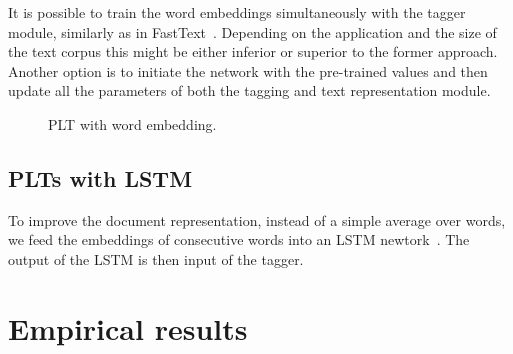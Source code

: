 \documentclass{article}
\newcommand{\sectionBefore}{-0pt}
\newcommand{\sectionAfter}{-0pt}
\begin{document}
It is possible to train the word embeddings simultaneously with the tagger module, similarly as in FastText~\citep{}. Depending on the application and the size of the text corpus this might be either inferior or superior to the former approach. Another option is to initiate the network with the pre-trained values and then update all the parameters of both the tagging and text representation module. 

\begin{figure}
	\begin{center}
		
	\end{center}
	\caption{PLT with word embedding.}
	\label{pic:model-embedding}
\end{figure}



\vspace{\sectionBefore}
\subsection{PLTs with LSTM}
\label{sec:sparse_input}
\vspace{\sectionAfter}

To improve the document representation, instead of a simple average over words, we feed the embeddings of consecutive words into an LSTM newtork~\citep{!}. The output of the LSTM is then input of the tagger.




\vspace{\sectionBefore}
\section{Empirical results}
\label{sec:empirical_results}
\vspace{\sectionAfter}
\end{document}
